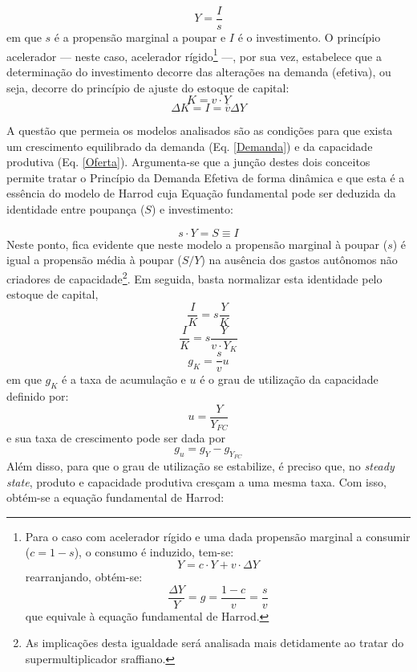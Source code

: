 \begin{equation}
\label{Demanda}
Y = \frac{I}{s}
\end{equation}
em que $s$ é a propensão marginal a poupar e $I$ é o investimento.
O princípio acelerador --- neste caso, acelerador rígido\footnote{Para o caso com acelerador rígido e uma dada propensão marginal a consumir ($c = 1-s$), o consumo é induzido, tem-se:
	$$
	Y = c\cdot Y + v\cdot \Delta Y
	$$
	rearranjando, obtém-se:
	$$
	\frac{\Delta Y}{Y} = g = \frac{1 - c}{v} = \frac{s}{v}
	$$
	que equivale à equação fundamental de Harrod.
} ---, por sua vez, estabelece que a determinação do investimento decorre das alterações na demanda (efetiva), ou seja, decorre do princípio de ajuste do estoque de capital:
$$
K = v\cdot Y
$$
\begin{equation}
\Delta K = I = \overline{v}\Delta Y
\end{equation}


A questão que permeia os modelos analisados são as condições para que exista um crescimento equilibrado da demanda (Eq. \ref{Demanda}) e da capacidade produtiva (Eq. \ref{Oferta}). 
Argumenta-se que a junção destes dois conceitos permite tratar o Princípio da Demanda Efetiva de forma dinâmica e que esta é a essência do modelo de Harrod cuja Equação fundamental pode ser deduzida da identidade entre poupança ($S$) e investimento:

$$
s\cdot Y = S \equiv I
$$
Neste ponto, fica evidente que neste modelo a propensão marginal à poupar ($s$) é igual a propensão média à poupar ($S/Y$) na ausência dos gastos autônomos não criadores de capacidade\footnote{As implicações desta igualdade será analisada mais detidamente ao tratar do supermultiplicador sraffiano.}. Em seguida, basta normalizar esta identidade pelo estoque de capital,
$$
\frac{I}{K} = s\frac{Y}{K}
$$
$$
\frac{I}{K} = s\frac{Y}{v\cdot Y_K}
$$
\begin{equation}
    g_K = \frac{s}{v}u
\end{equation}
em que $g_K$ é a taxa de acumulação e $u$ é o grau de utilização da capacidade definido por:
$$
u = \frac{Y}{Y_{FC}}
$$
e sua taxa de crescimento pode ser dada por
$$
g_u = g_Y - g_{Y_{FC}}
$$
Além disso, para que o grau de utilização se estabilize, é preciso que, no \textit{steady state}, produto e capacidade produtiva cresçam a uma mesma taxa. Com isso, obtém-se a equação fundamental de Harrod:

